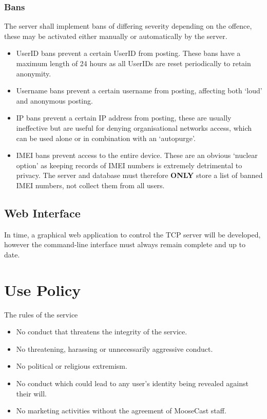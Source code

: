 \documentclass[12pt, a4paper]{article}
\begin{document}
\subsubsection{Bans}
The server shall implement bans of differing severity depending on the offence, these may be activated either manually or automatically by the server.
\begin{itemize}
\item UserID bans prevent a certain UserID from posting. These bans have a maximum length of 24 hours as all UserIDs are reset periodically to retain anonymity.
\item Username bans prevent a certain username from posting, affecting both `loud' and anonymous posting.
\item IP bans prevent a certain IP address from posting, these are usually ineffective but are useful for denying organisational networks access, which can be used alone or in combination with an `autopurge'.
\item IMEI bans prevent access to the entire device. These are an obvious `nuclear option' as keeping records of IMEI numbers is extremely detrimental to privacy. The server and database must therefore \textbf{ONLY} store a list of banned IMEI numbers, not collect them from all users.
\end{itemize}

\subsection{Web Interface}
In time, a graphical web application to control the TCP server will be developed, however the command-line interface must always remain complete and up to date.
\clearpage
\section{Use Policy}
The rules of the service
\begin{itemize}
\item No conduct that threatens the integrity of the service.
\item No threatening, harassing or unnecessarily aggressive conduct.
\item No political or religious extremism.
\item No conduct which could lead to any user's identity being revealed against their will.
\item No marketing activities without the agreement of MooseCast staff. 
\end{itemize}
\end{document}
